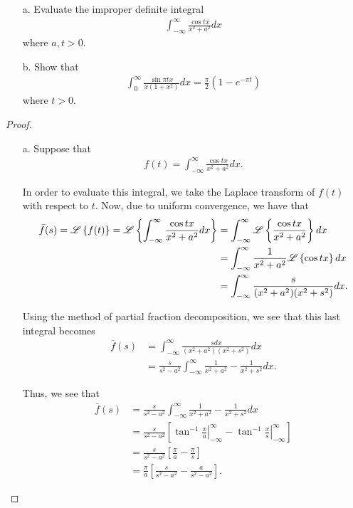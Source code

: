 \begin{problem}{2}
  \begin{enumerate}
    \item[a.] Evaluate the improper definite integral
      \begin{align*}
        \int_{-\infty}^\infty \frac{\cos tx}{x^2+a^2} dx
      \end{align*}
      where $a, t > 0$.
    \item[b.] Show that
      \begin{align*}
        \int_0^\infty \frac{ \sin \pi t x}{x(1+x^2)} dx = \frac{\pi}{2}(1-e^{-\pi t})
      \end{align*}
      where $t > 0$.
  \end{enumerate}
\end{problem}

\begin{proof}
  \begin{enumerate}
    \item[a.] Suppose that
      \begin{align*}
        f(t) = \int_{-\infty}^\infty \frac{\cos tx}{x^2+a^2} dx.
      \end{align*}

      In order to evaluate this integral, we take the Laplace transform of $f(t)$ with respect to $t$. Now, due to
      uniform convergence, we have that
      \begin{align*}
        \bar{f}(s) = \mathscr{L}\left\{ {f(t)} \right\} = \mathscr{L}\left\{ {\int_{-\infty}^\infty \frac{\cos tx}{x^2+a^2} dx} \right\}
        &= \int_{-\infty}^\infty \mathscr{L}\left\{ {\frac{\cos tx}{x^2+a^2}} \right\} dx \\
        &= \int_{-\infty}^\infty \frac{1}{x^2 + a^2}\mathscr{L}\left\{ {\cos tx} \right\}dx \\
        &= \int_{-\infty}^\infty \frac{s}{(x^2 + a^2)(x^2+s^2)}dx.
      \end{align*}

      Using the method of partial fraction decomposition, we see that this last integral becomes
      \begin{align*}
        \bar{f}(s)
        &= \int_{-\infty}^\infty \frac{sdx}{(x^2 + a^2)(x^2+s^2)}dx \\
        &= \frac{s}{s^2-a^2}\int_{-\infty}^\infty \frac{1}{x^2+a^2} - \frac{1}{x^2+s^2} dx.
      \end{align*}

      Thus, we see that
      \begin{align*}
        \bar{f}(s)
        &= \frac{s}{s^2-a^2}\int_{-\infty}^\infty \frac{1}{x^2+a^2} - \frac{1}{x^2+s^2} dx \\
        &= \frac{s}{s^2-a^2}\left[\left.\tan^{-1} \frac{x}{a}\right\rvert_{-\infty}^\infty - \left.\tan^{-1}\frac{x}{s}\right\rvert_{-\infty}^\infty\right] \\
        &= \frac{s}{s^2-a^2}\left[\frac{\pi}{a}-\frac{\pi}{s}\right] \\
        &= \frac{\pi}{a}\left[\frac{s}{s^2-a^2}-\frac{a}{s^2-a^2}\right].
      \end{align*}


\end{enumerate}
\end{proof}
